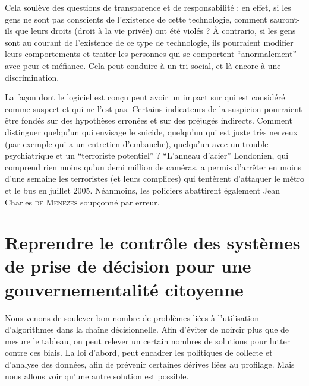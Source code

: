 \documentclass[a4paper,12pt]{report}
\begin{document}
Cela soulève des questions de transparence et de responsabilité ; en effet, si les gens ne sont pas conscients de l'existence de cette technologie, comment sauront-ils que leurs droits (droit à la vie privée) ont été violés ? À contrario, si les gens sont au courant de l'existence de ce type de technologie, ils pourraient modifier leurs comportements et traiter les personnes qui se comportent ``anormalement'' avec peur et méfiance. Cela peut conduire à un tri social, et là encore à une discrimination. 

La façon dont le logiciel est conçu peut avoir un impact sur qui est considéré comme suspect et qui ne l'est pas. Certains indicateurs de la suspicion pourraient être fondés sur des hypothèses erronées et sur des préjugés indirects. Comment distinguer quelqu'un qui envisage le suicide, quelqu'un qui est juste très nerveux (par exemple qui a un entretien d'embauche), quelqu'un avec un trouble psychiatrique et un ``terroriste potentiel'' ? ``L'anneau d'acier'' Londonien, qui comprend rien moins qu'un demi million de caméras, a permis d'arrêter en moins d'une semaine les terroristes (et leurs complices) qui tentèrent d'attaquer le métro et le bus en juillet 2005. Néanmoins, les policiers abattirent également Jean Charles \textsc{de Menezes} soupçonné par erreur.

\section{Reprendre le contrôle des systèmes de prise de décision pour une gouvernementalité citoyenne}

Nous venons de soulever bon nombre de problèmes liées à l'utilisation d'algorithmes dans la chaîne décisionnelle. Afin d'éviter de noircir plus que de mesure le tableau, on peut relever un certain nombres de solutions pour lutter contre ces biais. La loi d'abord, peut encadrer les politiques de collecte et d'analyse des données, afin de prévenir certaines dérives liées au profilage. Mais nous allons voir qu'une autre solution est possible.
\end{document}
